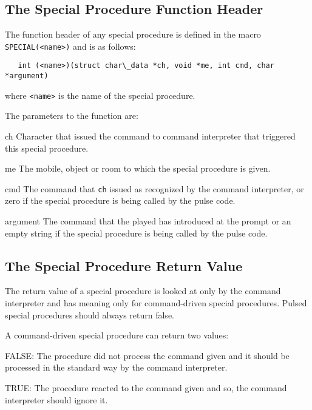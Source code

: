 \documentclass[11pt]{article}
\newenvironment{Ventry}[1]
  {\begin{list}{}{\renewcommand{\makelabel}[1]{\textsf{##1:}\hfil}
    \settowidth{\labelwidth}{\textsf{#1:}}
    \setlength{\leftmargin}{\labelwidth}
    \addtolength{\leftmargin}{\labelsep}
  }
  }
  {\end{list}}
\begin{document}
\subsection{The Special Procedure Function Header}
The function header of any special procedure is defined in the macro \texttt{SPECIAL(<name>)} and is as follows:
\begin{verbatim}
   int (<name>)(struct char\_data *ch, void *me, int cmd, char *argument)
\end{verbatim}
where \texttt{<name>} is the name of the special procedure.
\par
The parameters to the function are:
\begin{Ventry}{argument}
\item[ch] Character that issued the command to command interpreter that triggered this special procedure.
\item[me] The mobile, object or room to which the special procedure is given.
\item[cmd] The command that \texttt{ch} issued as recognized by the command interpreter, or zero if the special procedure is being called by the pulse code.
\item[argument] The command that the played has introduced at the prompt or an empty string if the special procedure is being called by the pulse code.
\end{Ventry}

\subsection{The Special Procedure Return Value}
The return value of a special procedure is looked at only by the command interpreter and has meaning only for command-driven special procedures. Pulsed special procedures should always return false.
\par
A command-driven special procedure can return two values:
\begin{Ventry}{FALSE:}
\item[FALSE:] The procedure did not process the command given and it should be processed in the standard way by the command interpreter.
\item[TRUE:] The procedure reacted to the command given and so, the command interpreter should ignore it.
\end{Ventry}
\end{document}
